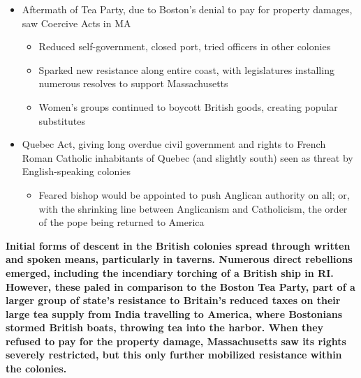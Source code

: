 \documentclass[a4paper]{article}
\begin{document}
{\begin{itemize}
\begin{itemize}
            \begin{itemize}
                \item Women had always been key players in resistance activities (\textit{ex}: Mercy Otis Warren, with satirical plays)
                \begin{itemize}
                    \item Formed "Daughters of Liberty" in 1760s, who often mocked men for insufficient fervor; challenged tea in 1773
                \end{itemize}
                \item Plans emerged to prevent cargoes of EIC from arriving in ports 
                \begin{itemize}
                    \item In Philadelphia/NYC, tea never left ships; in Charles Town, stored in public warehouses
                    \item Boston, failing to prevent ships, saw group of Patriots break into three ships and toss tea chests into harbor 
                \end{itemize}
            \end{itemize}
        \end{itemize}
        \item Aftermath of Tea Party, due to Boston's denial to pay for property damages, saw Coercive Acts in MA
        \begin{itemize}
            \item Reduced self-government, closed port, tried officers in other colonies
            \item Sparked new resistance along entire coast, with legislatures installing numerous resolves to support Massachusetts
            \item Women's groups continued to boycott British goods, creating popular substitutes
        \end{itemize}
        \item Quebec Act, giving long overdue civil government and rights to French Roman Catholic inhabitants of Quebec (and slightly south) seen as threat by English-speaking colonies
        \begin{itemize}
            \item Feared bishop would be appointed to push Anglican authority on all; or, with the shrinking line between Anglicanism and Catholicism, the order of the pope being returned to America
        \end{itemize}
    \end{itemize}
    \textbf{Initial forms of descent in the British colonies spread through written and spoken means, particularly in taverns. Numerous direct rebellions emerged, including the incendiary torching of a British ship in RI. However, these paled in comparison to the Boston Tea Party, part of a larger group of state's resistance to Britain's reduced taxes on their large tea supply from India travelling to America, where Bostonians stormed British boats, throwing tea into the harbor. When they refused to pay for the property damage, Massachusetts saw its rights severely restricted, but this only further mobilized resistance within the colonies.}}
\end{document}
